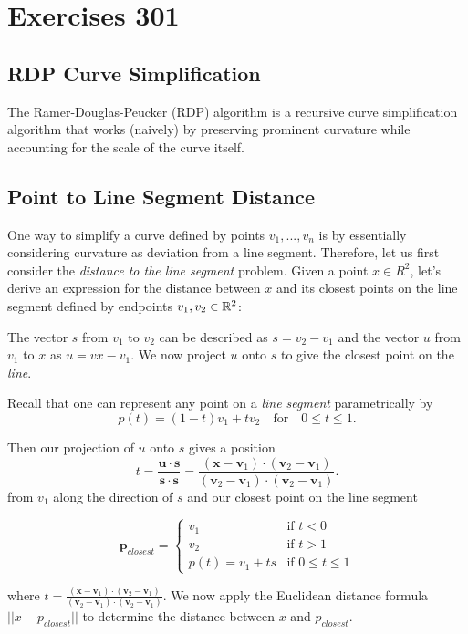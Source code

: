 \section{Exercises 301}
\subsection{RDP Curve Simplification}
The Ramer-Douglas-Peucker (RDP) algorithm is a recursive curve simplification algorithm that works (naively) by preserving prominent curvature while accounting for the scale of the curve itself.  

 
\subsection{Point to Line Segment Distance}

One way to simplify a curve defined by points $v_1, . . ., v_n$ is by essentially considering curvature as deviation from a line segment.   Therefore, let us first consider the \textit{distance to the line segment} problem. Given a point $x \in R^2$, let's derive an expression for the distance between $x$ and its closest points on the line segment defined by endpoints $v_1, v_2 \in \mathbb{R}^2$:

 The vector $s$ from $v_1$ to $v_2$ can be described as $s= v_2 - v_1$ and the vector $u$ from $v_1$ to $x$ as $u = vx - v_1$.  We now project $u$ onto $s$ to give the closest point on the \emph{line}. 

Recall that one can represent any point on a \emph{line segment} parametrically by
\[p(t) = (1 -t)v_1 + tv_2 \quad \text{for} \quad   0 \leq t \leq 1.\]

Then our projection of $u$ onto $s$ gives a position $$ t = \frac{\mathbf{u} \cdot \mathbf{s}}{\mathbf{s} \cdot \mathbf{s}} = \frac{(\mathbf{x} - \mathbf{v}_1) \cdot (\mathbf{v}_2 - \mathbf{v}_1)}{(\mathbf{v}_2 - \mathbf{v}_1) \cdot (\mathbf{v}_2 - \mathbf{v}_1)}. $$ 
from $v_1$ along the direction of $s$ and our closest point on the line segment


$$\mathbf{p}_{closest} = \begin{cases} 
v_1  & \text{if }  t < 0\\
v_2  & \text{if } t > 1 \\
p(t) = v_1 + ts & \text{if } 0 \leq t \leq 1
 \end{cases} $$


where $t=\frac{(\mathbf{x}-\mathbf{v}_{1})\cdot (\mathbf{v}_{2}-\mathbf{v}_{1})}{(\mathbf{v}_{2}-\mathbf{v}_{1})\cdot (\mathbf{v}_{2}-\mathbf{v}_{1})}$.  We now apply the Euclidean distance formula 
$||x - p_{closest}||$
to determine the distance between $x$ and $p_{closest}$.  \\


